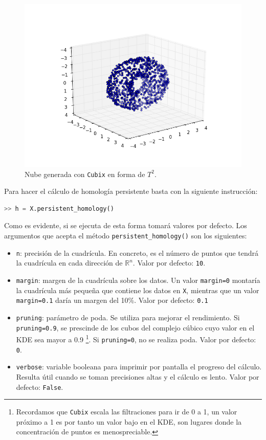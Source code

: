 \documentclass[12pt,a4paper,twoside]{article} %
\theoremstyle{plain}
\theoremstyle{definition}
\newcommand{\R}{\mathbb{R}}
\begin{document}
\begin{figure}[h!]
\centering
\includegraphics[scale=0.55]{img/t2.png}
\caption{Nube generada con \texttt{Cubix} en forma de $T^2$.}
\label{t2}
\end{figure}

Para hacer el cálculo de homología persistente basta con la siguiente instrucción:
\begin{lstlisting}[language=python]
  >> h = X.persistent_homology()
\end{lstlisting}

Como es evidente, si se ejecuta de esta forma tomará valores por defecto. Los argumentos que acepta el método \texttt{persistent\_homology()} son los siguientes:
\begin{itemize}
\item \texttt{n}: precisión de la cuadrícula. En concreto, es el número de puntos que tendrá la cuadrícula en cada dirección de $\R^n$. Valor por defecto: \texttt{10}.
\item \texttt{margin}: margen de la cuadrícula sobre los datos. Un valor \texttt{margin=0} montaría la cuadrícula más pequeña que contiene los datos en \texttt{X}, mientras que un valor \texttt{margin=0.1} daría un margen del 10\%. Valor por defecto: \texttt{0.1}
\item \texttt{pruning}: parámetro de poda. Se utiliza para mejorar el rendimiento. Si \texttt{pruning=0.9}, se prescinde de los cubos del complejo cúbico cuyo valor en el KDE sea mayor a 0.9 \footnote{Recordamos que \texttt{Cubix} escala las filtraciones para ir de 0 a 1, un valor próximo a 1 es por tanto un valor bajo en el KDE, son lugares donde la concentración de puntos es menospreciable.}. Si \texttt{pruning=0}, no se realiza poda. Valor por defecto: \texttt{0}.
\item \texttt{verbose}: variable booleana para imprimir por pantalla el progreso del cálculo. Resulta útil cuando se toman precisiones altas y el cálculo es lento. Valor por defecto: \texttt{False}.
\end{itemize}
\end{document}
